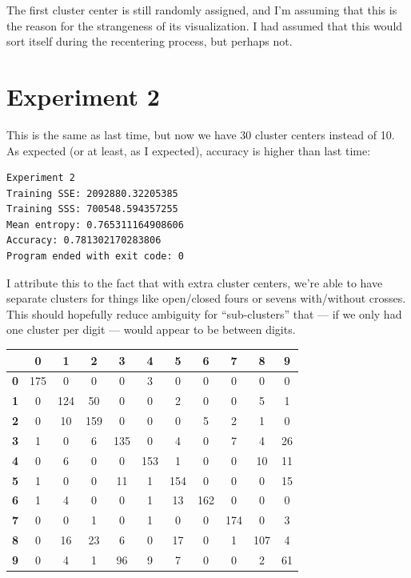\documentclass[11pt, oneside]{article}    %
\begin{document}
The first cluster center is still randomly assigned, and I'm assuming that this is the reason for the strangeness of its visualization. I had assumed that this would sort itself during the recentering process, but perhaps not.

\section{Experiment 2}

This is the same as last time, but now we have 30 cluster centers instead of 10. As expected (or at least, as I expected), accuracy is higher than last time:

\begin{verbatim}
Experiment 2
Training SSE: 2092880.32205385
Training SSS: 700548.594357255
Mean entropy: 0.765311164908606
Accuracy: 0.781302170283806
Program ended with exit code: 0
\end{verbatim}

I attribute this to the fact that with extra cluster centers, we're able to have separate clusters for things like open/closed fours or sevens with/without crosses. This should hopefully reduce ambiguity for ``sub-clusters'' that --- if we only had one cluster per digit --- would appear to be between digits.

\begin{center}
	\begin{tabular}{|c|c|c|c|c|c|c|c|c|c|c|}
		\hline
		& \textbf{0} & \textbf{1} & \textbf{2} & \textbf{3} & \textbf{4} & \textbf{5} & \textbf{6} & \textbf{7} & \textbf{8} & \textbf{9} \\ \hline
		\textbf{0} & 175 & 0 & 0 & 0 & 3 & 0 & 0 & 0 & 0 & 0 \\ \hline
		\textbf{1} & 0 & 124 & 50 & 0 & 0 & 2 & 0 & 0 & 5 & 1 \\ \hline
		\textbf{2} & 0 & 10 & 159 & 0 & 0 & 0 & 5 & 2 & 1 & 0 \\ \hline
		\textbf{3} & 1 & 0 & 6 & 135 & 0 & 4 & 0 & 7 & 4 & 26 \\ \hline
		\textbf{4} & 0 & 6 & 0 & 0 & 153 & 1 & 0 & 0 & 10 & 11 \\ \hline
		\textbf{5} & 1 & 0 & 0 & 11 & 1 & 154 & 0 & 0 & 0 & 15 \\ \hline
		\textbf{6} & 1 & 4 & 0 & 0 & 1 & 13 & 162 & 0 & 0 & 0 \\ \hline
		\textbf{7} & 0 & 0 & 1 & 0 & 1 & 0 & 0 & 174 & 0 & 3 \\ \hline
		\textbf{8} & 0 & 16 & 23 & 6 & 0 & 17 & 0 & 1 & 107 & 4 \\ \hline
		\textbf{9} & 0 & 4 & 1 & 96 & 9 & 7 & 0 & 0 & 2 & 61 \\ \hline
	\end{tabular}
\end{center}
\end{document}

